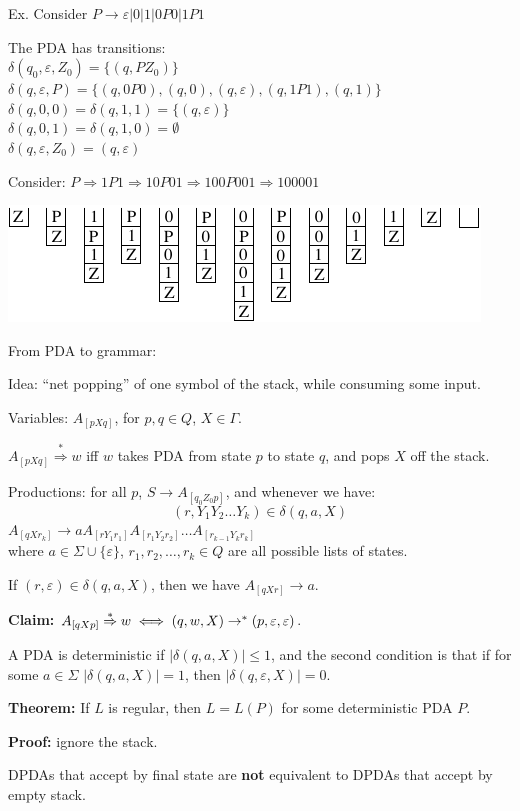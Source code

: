 \begin{frame}
Ex.  Consider $P\longrightarrow \varepsilon|0|1|0P0|1P1$

The PDA has transitions: \\
$\delta(q_0,\varepsilon,Z_0)=\{(q,PZ_0)\}$ \\
$\delta(q,\varepsilon,P)=\{(q,0P0),(q,0),(q,\varepsilon),(q,1P1),(q,1)\}$\\
$\delta(q,0,0)=\delta(q,1,1)=\{(q,\varepsilon)\}$ \\
$\delta(q,0,1)=\delta(q,1,0)=\emptyset$ \\
$\delta(q,\varepsilon,Z_0)=(q,\varepsilon)$

Consider:
$P\Rightarrow 1P1
\Rightarrow 10P01
\Rightarrow 100P001
\Rightarrow 100001$

\bigskip

\includegraphics{figures/9.pdf}
\end{frame}

\begin{frame}
From PDA to grammar:

Idea: ``net popping'' of one symbol of the stack, while consuming some
input.

Variables: $A_{[pXq]}$, for $p,q\in Q$, $X\in\Gamma$.  

$A_{[pXq]}\stackrel{*}{\Rightarrow}w$ iff $w$ takes PDA from state $p$
to state $q$, and pops $X$ off the stack.

Productions: for all $p$, $S\longrightarrow A_{[q_0Z_0p]}$, and
whenever we have:
$$
(r,Y_1Y_2\ldots Y_k)\in\delta(q,a,X)
$$ 
$A_{[qXr_k]}\longrightarrow aA_{[rY_1r_1]}A_{[r_1Y_2r_2]}\ldots
A_{[r_{k-1}Y_kr_k]}$ \\
where $a\in\Sigma\cup\{\varepsilon\}$, $r_1,r_2,\ldots,r_k\in Q$ are
all possible lists of states.

If $(r,\varepsilon)\in\delta(q,a,X)$, then we have
$A_{[qXr]}\longrightarrow a$.

{\bf Claim:} $A_{[qXp]}\stackrel{*}{\Rightarrow} w \iff
(q,w,X)\rightarrow^*(p,\varepsilon,\varepsilon)$.
\end{frame}

\begin{frame}
A PDA is deterministic if $|\delta(q,a,X)|\le 1$, and the second
condition is that if for some $a\in\Sigma$ $|\delta(q,a,X)|=1$, then
$|\delta(q,\varepsilon,X)|=0$.

{\bf Theorem:} If $L$ is regular, then $L=L(P)$ for some deterministic
PDA $P$.

{\bf Proof:} ignore the stack.

DPDAs that accept by final state are {\bf not} equivalent to DPDAs
that accept by empty stack.
\end{frame}

